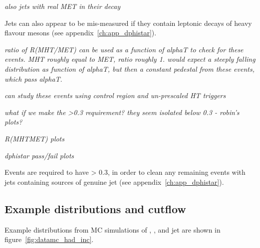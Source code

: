 \emph{also jets with real MET in their decay}

Jets can also appear to be mis-measured if they contain leptonic decays of heavy
flavour mesons (see appendix~\ref{ch:app_dphistar}). 

\emph{ratio of R(MHT/MET) can be used as a function of alphaT to check for
these events. MHT roughly equal to MET, ratio roughly 1. would expect a steeply
falling distribution as function of alphaT, but then a constant pedestal from
these events, which pass alphaT}.

\emph{can study these events using control region and un-prescaled HT triggers}

\emph{what if we make the >0.3 requirement? they seem isolated below 0.3 -
robin's plots?}

\emph{R(MHTMET) plots}

\emph{dphistar pass/fail plots}

Events are required to have \dphistar > 0.3, in
order to clean any remaining events with jets containing sources of genuine \met jet (see
appendix~\ref{ch:app_dphistar}).


\subsection{Example distributions and cutflow}

Example distributions from MC simulations of \alphat, \HT, \mht and jet \Pt  are
shown in figure~\ref{fig:datamc_had_inc}.

